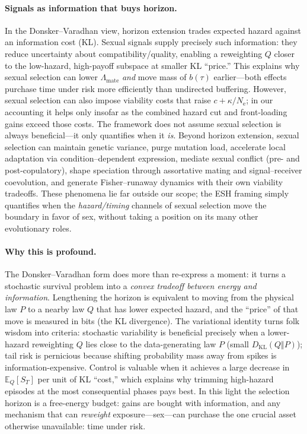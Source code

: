 \documentclass[11pt]{article}
\theoremstyle{upright}
\newcommand{\E}{\mathbb{E}}
\newcommand{\Ne}{N_{\mathrm{e}}}
\begin{document}
\paragraph{Signals as information that buys horizon.}
In the Donsker--Varadhan view, horizon extension trades expected hazard against an information cost (KL). Sexual 
signals supply precisely such information: they reduce uncertainty about compatibility/quality, enabling a 
reweighting $Q$ closer to the low-hazard, high-payoff subspace at smaller KL “price.” This explains why sexual 
selection can lower $\Lambda_{\mathrm{mate}}$ \emph{and} move mass of $b(\tau)$ earlier—both effects purchase 
time under risk more efficiently than undirected buffering. However, sexual selection can also impose viability costs 
that raise $c+\kappa/\Ne$; in our accounting it helps only insofar as the combined hazard cut and front-loading 
gains exceed those costs. The framework does not assume sexual selection is always beneficial—it only quantifies 
when it \emph{is}. Beyond horizon extension, sexual selection can maintain genetic variance, purge mutation load, 
accelerate local adaptation via condition–dependent expression, mediate sexual conflict (pre- and post-copulatory), 
shape speciation through assortative mating and signal–receiver coevolution, and generate Fisher–runaway dynamics 
with their own viability tradeoffs. These phenomena lie far outside our scope; the ESH framing simply quantifies 
when the \emph{hazard/timing} channels of sexual selection move the boundary in favor of sex, without taking 
a position on its many other evolutionary roles.

\paragraph{Why this is profound.}
The Donsker--Varadhan form does more than re-express a moment: it turns a stochastic survival problem into a \emph{convex tradeoff between energy and information}.
Lengthening the horizon is equivalent to moving from the physical law $P$ to a nearby law $Q$ that has lower expected hazard, and the
``price'' of that move is measured in bits (the KL divergence).  The variational identity turns folk wisdom into criteria: stochastic variability 
is beneficial precisely when a lower-hazard reweighting $Q$ lies close to the data-generating law $P$ (small $D_{\mathrm{KL}}(Q\Vert P)$); 
tail risk is pernicious because shifting probability mass away from spikes is information-expensive. Control is valuable when it achieves 
a large decrease in $\E_Q[S_T]$ per unit of KL “cost,” which explains why trimming high-hazard episodes at the most consequential 
phases pays best. In this light the selection horizon is a free-energy budget: gains are bought with information, and any mechanism 
that can \emph{reweight} exposure—sex—can purchase the one crucial asset otherwise unavailable: time under risk.
\end{document}
